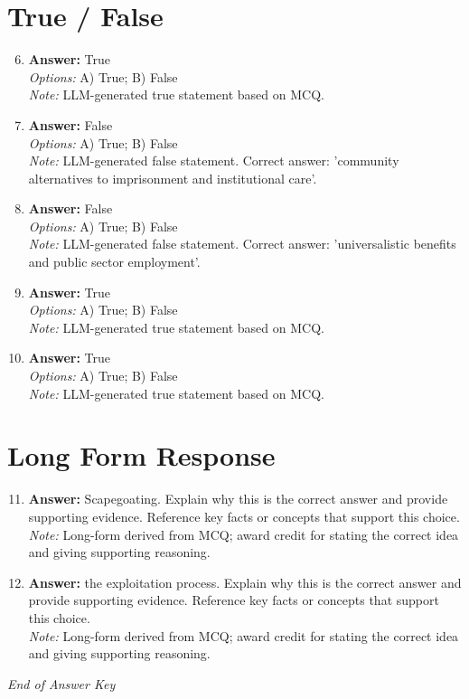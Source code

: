 \documentclass[12pt]{article}
\begin{document}
\section*{True / False}
\begin{enumerate}[label=\arabic*.]
\setcounter{enumi}{5}
\item \textbf{Answer:} True
\\ \textit{Options:} A) True; B) False
\\ \textit{Note:} LLM-generated true statement based on MCQ.
\item \textbf{Answer:} False
\\ \textit{Options:} A) True; B) False
\\ \textit{Note:} LLM-generated false statement. Correct answer: 'community alternatives to imprisonment and institutional care'.
\item \textbf{Answer:} False
\\ \textit{Options:} A) True; B) False
\\ \textit{Note:} LLM-generated false statement. Correct answer: 'universalistic benefits and public sector employment'.
\item \textbf{Answer:} True
\\ \textit{Options:} A) True; B) False
\\ \textit{Note:} LLM-generated true statement based on MCQ.
\item \textbf{Answer:} True
\\ \textit{Options:} A) True; B) False
\\ \textit{Note:} LLM-generated true statement based on MCQ.
\end{enumerate}

\section*{Long Form Response}
\begin{enumerate}[label=\arabic*.]
\setcounter{enumi}{10}
\item \textbf{Answer:} Scapegoating. Explain why this is the correct answer and provide supporting evidence. Reference key facts or concepts that support this choice.
\\ \textit{Note:} Long-form derived from MCQ; award credit for stating the correct idea and giving supporting reasoning.
\item \textbf{Answer:} the exploitation process. Explain why this is the correct answer and provide supporting evidence. Reference key facts or concepts that support this choice.
\\ \textit{Note:} Long-form derived from MCQ; award credit for stating the correct idea and giving supporting reasoning.
\end{enumerate}

\vfill
\noindent\textit{End of Answer Key}
\end{document}

